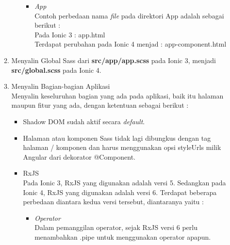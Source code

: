 \begin{enumerate}
\begin{enumerate}
\begin{itemize}
\begin{itemize}
				\item {\it App} \\
				Contoh perbedaan nama {\it file} pada direktori App adalah sebagai berikut : \\
				Pada Ionic 3 : app.html \\
				Terdapat perubahan pada Ionic 4 menjad : app-component.html
			\end{itemize}



			
		\end{itemize}
		

		\item Menyalin Global Sass dari \textbf{src/app/app.scss} pada Ionic 3, menjadi \textbf{src/global.scss} pada Ionic 4.

		\item Menyalin Bagian-bagian Aplikasi \\
		Menyalin keseluruhan bagian yang ada pada aplikasi, baik itu halaman maupun fitur yang ada, dengan ketentuan sebagai berikut :

		\begin{itemize}
			\item Shadow DOM sudah aktif secara {\it default}.
			\item Halaman atau komponen Sass tidak lagi dibungkus dengan tag halaman / komponen dan harus menggunakan opsi styleUrls milik Angular dari dekorator @Component.
			\item RxJS \\
			Pada Ionic 3, RxJS yang digunakan adalah versi 5. Sedangkan pada Ionic 4, RxJS yang digunakan adalah versi 6. Terdapat beberapa perbedaan diantara kedua versi tersebut, diantaranya yaitu :
			\begin{itemize}
				\item {\it Operator} \\
				Dalam pemanggilan operator, sejak RxJS versi 6 perlu menambahkan .pipe untuk menggunakan operator apapun.
			\end{itemize}



\end{itemize}
\end{enumerate}
\end{enumerate}
